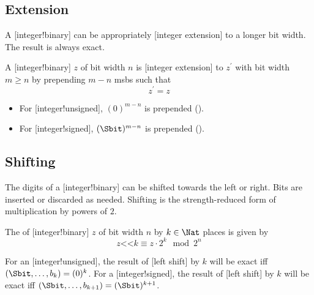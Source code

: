 \subsection{Extension}

A [integer!binary] can be appropriately [integer extension] to a longer bit width.
The result is always exact.

\begin{definition}
    A [integer!binary] \(z\) of bit width \(n\) is [integer extension] to \(z^\prime\) with bit width \(m \ge n\) by prepending \(m - n\) \glspl{msb} such that
    \begin{equation*}
        \label{eq:ext}
        \tag{ext}
        z^\prime = z
    \end{equation*}
    \begin{itemize}
        \item For [integer!unsigned], \((0)^{m-n}\) is prepended ().
        \item For [integer!signed], \((\Sbit)^{m-n}\) is prepended ().
    \end{itemize}
\end{definition}

\subsection{Shifting}

The digits of a [integer!binary] can be shifted towards the left or right.
Bits are inserted or discarded as needed.
Shifting is the strength-reduced form of multiplication by powers of \(2\).

\begin{definition}
    The  of [integer!binary] \(z\) of bit width \(n\) by \(k \in \Nat\) places is given by
    \begin{equation*}
        \label{eq:shl}
        \tag{shl}
        z \mathbin{\texttt{<<}} k \equiv z \cdot 2^k \mod 2^n
    \end{equation*}
\end{definition}

For an [integer!unsigned], the result of [left shift] by \(k\) will be exact iff \((\Sbit, \ldots, b_k) = (0)^k\).
For a [integer!signed], the result of [left shift] by \(k\) will be exact iff \((\Sbit, \ldots, b_{k+1}) = (\Sbit)^{k+1}\).

